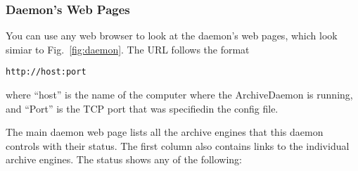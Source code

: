\subsubsection{Daemon's Web Pages} \label{sec:daemonserver}
You can use any web browser to look at the daemon's web pages,
which look simiar to Fig.~\ref{fig:daemon}.
The URL follows the format
\begin{lstlisting}[keywordstyle=\sffamily]
    http://host:port
\end{lstlisting}
\noindent where ``host'' is the name of the computer where the
ArchiveDaemon is running, and ``Port'' is the TCP port that was
specifiedin the config file.

The main daemon web page lists all the archive engines that this daemon controls
with their status. The first column also contains links to the
individual archive engines. The status shows any of the following:

